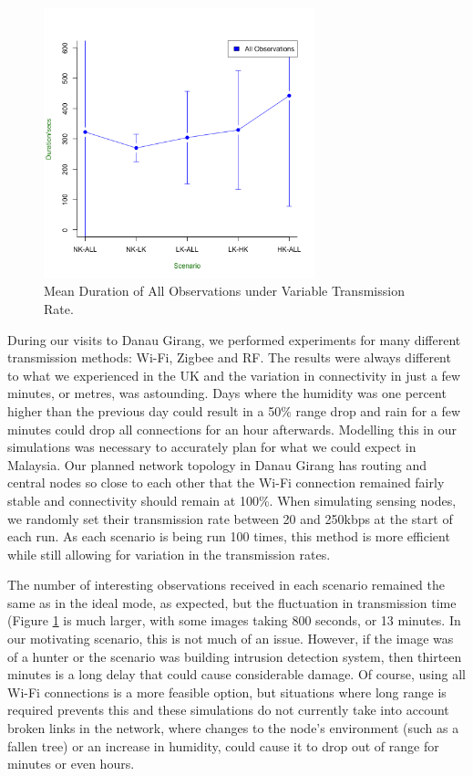 	\begin{figure}[h]
	\centering
	\includegraphics[width=0.70\textwidth]{Chap7/figures/real_all_dur}
	\caption{Mean Duration of All Observations under Variable Transmission Rate.}
	\label{fig:real:dur}
	\end{figure}	

During our visits to Danau Girang, we performed experiments for many different transmission methods: Wi-Fi, Zigbee and RF. The results were always different to what we experienced in the UK and the variation in connectivity in just a few minutes, or metres, was astounding. Days where the humidity was one percent higher than the previous day could result in a 50\% range drop and rain for a few minutes could drop all connections for an hour afterwards. Modelling this in our simulations was necessary to accurately plan for what we could expect in Malaysia. Our planned network topology in Danau Girang has routing and central nodes so close to each other that the Wi-Fi connection remained fairly stable and connectivity should remain at 100\%. When simulating sensing nodes, we randomly set their transmission rate between 20 and 250kbps at the start of each run. As each scenario is being run 100 times, this method is more efficient while still allowing for variation in the transmission rates. 

The number of interesting observations received in each scenario remained the same as in the ideal mode, as expected, but the fluctuation in transmission time (Figure \ref{fig:real:dur} is much larger, with some images taking 800 seconds, or 13 minutes. In our motivating scenario, this is not much of an issue. However, if the image was of a hunter or the scenario was building intrusion detection system, then thirteen minutes is a long delay that could cause considerable damage. Of course, using all Wi-Fi connections is a more feasible option, but situations where long range is required prevents this and these simulations do not currently take into account broken links in the network, where changes to the node's environment (such as a fallen tree) or an increase in humidity, could cause it to drop out of range for minutes or even hours. 

